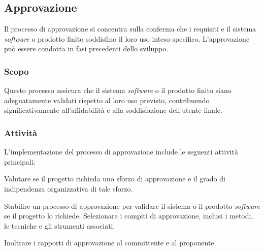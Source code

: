 \subsection{Approvazione}
\label{subsec:approvazione}

Il processo di approvazione si concentra sulla conferma che i requisiti e il
sistema \textit{software} o prodotto finito soddisfino il loro uso inteso
specifico. L'approvazione può essere condotta in fasi precedenti dello sviluppo.

\subsubsection{Scopo}

Questo processo assicura che il sistema \textit{software} o il prodotto finito
siano adeguatamente validati rispetto al loro uso previsto, contribuendo
significativamente all'affidabilità e alla soddisfazione dell'utente finale.

\subsubsection{Attività}
L'implementazione del processo di approvazione include le seguenti attività
principali:

Valutare se il progetto richieda uno sforzo
	  di approvazione e il grado di indipendenza organizzativa di tale
	  sforzo.

Stabilire un processo di approvazione per
	  validare il sistema o il prodotto \textit{software} se il progetto lo
	  richiede. Selezionare i compiti di approvazione, inclusi i metodi, le
	  tecniche e gli strumenti associati.



Inoltrare i rapporti di approvazione al committente e al proponente.
